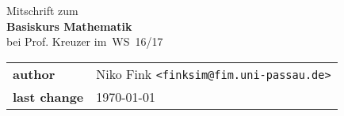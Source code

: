 \documentclass[a4paper,10pt]{article}
\begin{document}
\begin{titlepage}
	\begin{center}
		\huge Mitschrift zum \\
		\Huge \textbf{Basiskurs Mathematik} \\
		\huge bei Prof. Kreuzer im WS 16/17 \\
		\normalsize

		\vspace{1cm}
		\begin{tabular}[b]{l|l}
			\textbf{author} & Niko Fink \texttt{<finksim@fim.uni-passau.de>} \\
			\textbf{last change} & \today
		\end{tabular}

		\vspace{1cm}
		\tableofcontents
	\end{center}
\end{titlepage}

\setcounter{section}{9}



\end{document}

